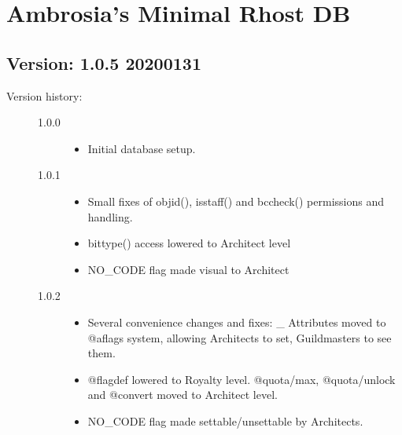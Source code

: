 \documentclass[letterpaper,10pt,english]{sphinxmanual}
\begin{document}
\chapter{Ambrosia’s Minimal Rhost DB}
\label{\detokenize{ambrosiadb:ambrosia-s-minimal-rhost-db}}\label{\detokenize{ambrosiadb::doc}}

\section{Version: 1.0.5          2020\sphinxhyphen{}01\sphinxhyphen{}31}
\label{\detokenize{ambrosiadb:version-1-0-5-2020-01-31}}\begin{description}
\item[{Version history:}] \leavevmode\begin{description}
\item[{1.0.0}] \leavevmode\begin{itemize}
\item {} 
\sphinxAtStartPar
Initial database setup.

\end{itemize}

\item[{1.0.1}] \leavevmode\begin{itemize}
\item {} 
\sphinxAtStartPar
Small fixes of objid(), isstaff() and bccheck() permissions and handling.

\item {} 
\sphinxAtStartPar
bittype() access lowered to Architect level

\item {} 
\sphinxAtStartPar
NO\_CODE flag made visual to Architect

\end{itemize}

\item[{1.0.2}] \leavevmode\begin{itemize}
\item {} 
\sphinxAtStartPar
Several convenience changes and fixes: \_ Attributes moved to @aflags
system, allowing Architects to set, Guildmasters to see them.

\item {} 
\sphinxAtStartPar
@flagdef lowered to Royalty level. @quota/max, @quota/unlock and @convert
moved to Architect level.

\item {} 
\sphinxAtStartPar
NO\_CODE flag made settable/unsettable by Architects.


\end{itemize}
\end{description}
\end{description}
\end{document}
